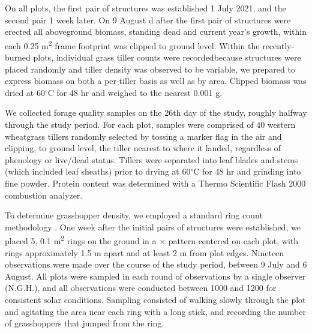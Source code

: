 \documentclass[referee, 
	            sn-basic]
           {sn-jnl}
\begin{document}
On all plots, the first pair of structures was established 1 July 2021, and the second pair 1 week later. 
On 9 August d after the first pair of structures were erected\textemdash 
all aboveground biomass, standing dead and current year's growth, within each 0.25 m\textsuperscript{2} frame footprint was clipped to ground level.
Within the recently-burned plots, individual grass tiller counts were recorded\textemdash because structures were placed randomly and tiller density was observed to be variable, we prepared to express biomass on both a per-tiller basis as well as by area. 
Clipped biomass was dried at 60$^\circ$C for 48 hr and weighed to the nearest 0.001 g. 


We collected forage quality samples on the 26th day of the study, roughly halfway through the study period.
For each plot, samples were comprised of 40 western wheatgrass tillers randomly selected by tossing a marker flag in the air and clipping, to ground level, the tiller nearest to where it landed, regardless of phenology or live/dead status. 
Tillers were  separated into leaf blades and stems (which included leaf sheaths) prior to drying at 60$^\circ$C for 48 hr and grinding into fine powder. 
Protein content was determined with a Thermo Scientific Flash 2000 combustion analyzer. 

To determine grasshopper density, we employed a standard ring count methodology
\citep{onsager1977, joern2013}. 
One week after the initial pairs of structures were established, we placed 5, 0.1 m\textsuperscript{2} rings on the ground in a {\large{$\times$}} pattern centered on each plot, with rings approximately 1.5 m apart and at least 2 m from plot edges.
Nineteen observations were made over the course of the study period, between 9 July and 6 August. 
All plots were sampled in each round of observations by a single observer (N.G.H.), and all observations were conducted between 1000 and 1200 for consistent solar conditions. 
Sampling consisted of walking slowly through the plot and agitating the area near each ring with a long stick, and recording the number of grasshoppers that jumped from the ring.
\end{document}

